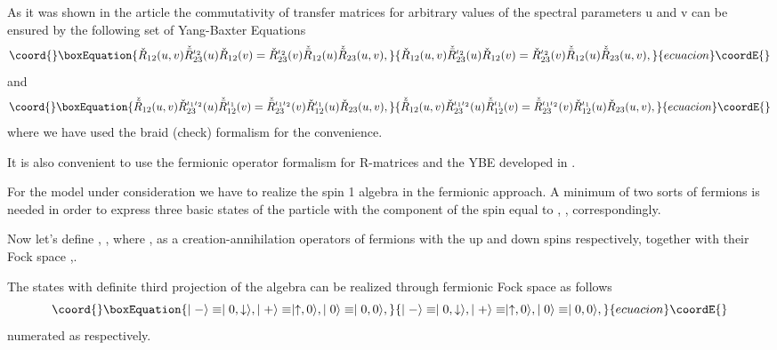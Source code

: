 \documentclass[a4paper,12pt]{article}
\begin{document}
As it was shown in the article \cite{APSS} the commutativity of 
transfer matrices \coordHE{} for arbitrary values of the
spectral parameters u and v can be ensured by the following set of 
Yang-Baxter Equations
\begin{equation}\coord{}\boxEquation{
\label{R3}
\check{R}_{12}(u,v)\check{\bar{R}}_{23}^{\iota_2}(u)\check{R}_{12}(v)=
\check{R}_{23}^{\iota_2}(v)\check{\bar{R}}_{12}(u)\check{\tilde{R}}_{23}(u,v),
}{
\check{R}_{12}(u,v)\check{\bar{R}}_{23}^{\iota_2}(u)\check{R}_{12}(v)=
\check{R}_{23}^{\iota_2}(v)\check{\bar{R}}_{12}(u)\check{\tilde{R}}_{23}(u,v),
}{ecuacion}\coordE{}\end{equation}
and
\begin{equation}\coord{}\boxEquation{
\label{R4}
\check{\tilde{R}}_{12}(u,v)\check{R}_{23}^{\iota_1\iota_2}(u)
\check{\bar{R}}_{12}^{\iota_1}(v)
=\check{\bar{R}}_{23}^{\iota_1\iota_2}(v)\check{R}_{12}^{\iota_1}(u)
\check{R}_{23}(u,v),
}{
\check{\tilde{R}}_{12}(u,v)\check{R}_{23}^{\iota_1\iota_2}(u)
\check{\bar{R}}_{12}^{\iota_1}(v)
=\check{\bar{R}}_{23}^{\iota_1\iota_2}(v)\check{R}_{12}^{\iota_1}(u)
\check{R}_{23}(u,v),
}{ecuacion}\coordE{}\end{equation}
where we have used the braid (check) formalism for the convenience.

It is also convenient to use the fermionic operator formalism for 
R-matrices and the YBE developed in \cite{HS, AK, GM, US}.

For the \coordHE{} model under consideration \cite{AK,U,L,S,KOR,BBO,EK} we 
have to
realize the spin 1 algebra in the fermionic approach. A minimum of two
sorts of fermions is needed in order to express three basic states 
\myHighlight{$\mid+\rangle,\mid 0 \rangle,\mid -\rangle$}\coordHE{} of the \coordHE{}
particle with the \coordHE{} component of the spin equal to \coordHE{}, \coordHE{}, \coordHE{} 
correspondingly.

Now let's define \coordHE{}, \coordHE{}, where \myHighlight{$\sigma=\uparrow
\downarrow$}\coordHE{}, as a creation-annihilation operators of fermions with the
 up and down spins respectively, together with their Fock space 
\coordHE{},\myHighlight{$ \mid{\sigma}\rangle$}\coordHE{}.

The states with definite third projection of the algebra \coordHE{}
can be realized through fermionic Fock space as follows
\begin{equation}\coord{}\boxEquation{
\label{S3}
\mid-\rangle \equiv \mid0 ,\downarrow \rangle, 
\mid+\rangle \equiv \mid \uparrow ,0 \rangle,
\mid0\rangle \equiv \mid0 ,0\rangle,
}{
\mid-\rangle \equiv \mid0 ,\downarrow \rangle, 
\mid+\rangle \equiv \mid \uparrow ,0 \rangle,
\mid0\rangle \equiv \mid0 ,0\rangle,
}{ecuacion}\coordE{}\end{equation}
numerated as \myHighlight{$\mid 1 \rangle,\mid 2 \rangle,\mid 3 \rangle$}\coordHE{} respectively.
\end{document}
